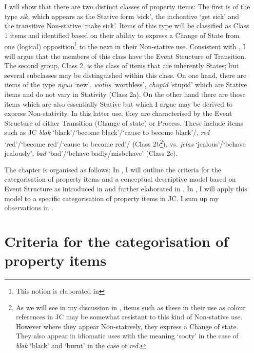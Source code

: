 I will show that there are two distinct classes of property items: The first is of the type \textit{sik,} which appears as the Stative form `sick', the inchoative `get sick' and the transitive Non-stative `make sick'. Items of this type will be classified as Class 1 items and identified based on their ability to express a Change of State from one (logical) opposition\footnote{This notion is elaborated in } to the next in their Non-stative use. Consistent with \citet{Pustejovsky1988,Pustejovsky1991}, I will argue that the members of this class have the Event Structure of Transition. The second group, Class 2, is the class of items that are inherently States; but several subclasses may be distinguished within this class. On one hand, there are items of the type \textit{nyuu} `new', \textit{wotlis} `worthless', \textit{chupid} `stupid' which are Stative items and do not vary in Stativity (Class 2a). On the other hand there are those items which are also essentially Stative but which I argue may be derived to express Non-stativity. In this latter use, they are characterised by the Event Structure of either Transition (Change of state) or Process. These include items such as JC \textit{blak} `black'/`become black'/`cause to become black'/, \textit{red} `red'/`become red'/`cause to become red'/ (Class 2b\footnote{As we will see in my discussion in , items such as these in their use as colour references in JC may be somewhat resistant to this kind of Non-stative use. However where they appear Non-statively, they express a Change of state. They also appear in idiomatic uses with the meaning ‘sooty’ in the case of \textit{blak} ‘black’ and ‘burnt’ in the case of \textit{red.}}), vs. \textit{jelas} `jealous'\slash`behave jealously', \textit{bad} `bad'\slash`behave badly\slash misbehave' (Class 2c). 


The chapter is organised as follows: In , I will outline the criteria for the categorisation of property items and a conceptual descriptive model based on Event Structure as introduced in  and further elaborated in . In , I will apply this model to a specific categorisation of property items in JC. I sum up my observations in . 

\section{Criteria for the categorisation of property items}\label{sec:5.1}

